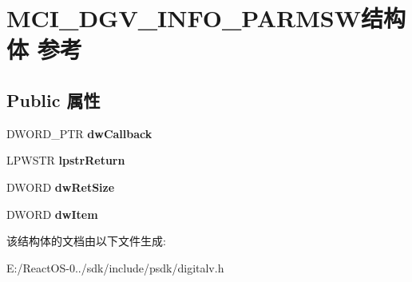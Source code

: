 \hypertarget{struct_m_c_i___d_g_v___i_n_f_o___p_a_r_m_s_w}{}\section{M\+C\+I\+\_\+\+D\+G\+V\+\_\+\+I\+N\+F\+O\+\_\+\+P\+A\+R\+M\+S\+W结构体 参考}
\label{struct_m_c_i___d_g_v___i_n_f_o___p_a_r_m_s_w}
\subsection*{Public 属性}
\begin{DoxyCompactItemize}
\item 
\mbox{\label{struct_m_c_i___d_g_v___i_n_f_o___p_a_r_m_s_w_a52d5e52f943a5c9d85f5d2288c204319}} 
D\+W\+O\+R\+D\+\_\+\+P\+TR {\bfseries dw\+Callback}
\item 
\mbox{\label{struct_m_c_i___d_g_v___i_n_f_o___p_a_r_m_s_w_a2c098d6fa6bd8938b6a6bed7194dad1c}} 
L\+P\+W\+S\+TR {\bfseries lpstr\+Return}
\item 
\mbox{\label{struct_m_c_i___d_g_v___i_n_f_o___p_a_r_m_s_w_a59dd6458311ffeabe905d1b272e97ef5}} 
D\+W\+O\+RD {\bfseries dw\+Ret\+Size}
\item 
\mbox{\label{struct_m_c_i___d_g_v___i_n_f_o___p_a_r_m_s_w_a5d662e7a5946b4ada215b98b7ad521ca}} 
D\+W\+O\+RD {\bfseries dw\+Item}
\end{DoxyCompactItemize}


该结构体的文档由以下文件生成\+:\begin{DoxyCompactItemize}
\item 
E\+:/\+React\+O\+S-\/0../sdk/include/psdk/digitalv.\+h\end{DoxyCompactItemize}
